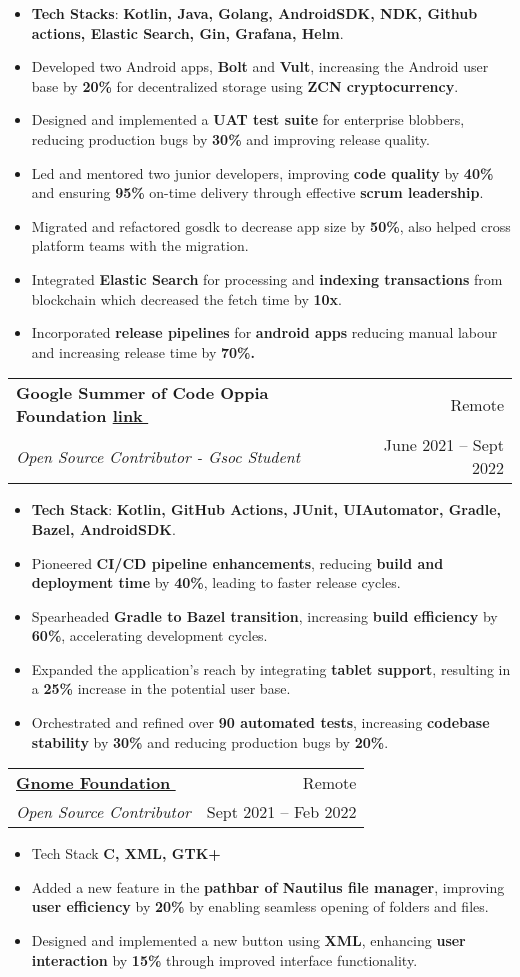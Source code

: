 \documentclass[letterpaper,1pt]{article}
\makeatletter
\let\orighref\href
\renewcommand{\href}[2]{\orighref{#1}{#2\,\faExternalLink}}
\newcommand{\resumeItem}[1]{
  \item\small{
    #1 \vspace{-1.1pt}
  }
}
\newcommand{\resumeSubheading}[4]{
  \vspace{-2.75pt}\item
    \begin{tabular*}{0.97\textwidth}{l@{\extracolsep{\fill}}r}
      \textbf{#1} & #2 \\
      \textit{\small#3} & {\small #4} \\
    \end{tabular*}
}
\newcommand{\resumeItemListStart}{\begin{itemize}}
\newcommand{\resumeItemListEnd}{\end{itemize}\vspace{-7pt}}
\makeatother
\begin{document}
\resumeItemListStart
\resumeItem {\textbf{Tech Stacks}: \textbf{Kotlin, Java, Golang, AndroidSDK, NDK, Github actions, Elastic Search, Gin, Grafana, Helm}.}
\resumeItem {Developed two Android apps, \textbf{Bolt} and \textbf{Vult}, increasing the Android user base by \textbf{20\%} for decentralized storage using \textbf{ZCN cryptocurrency}.}
\resumeItem {Designed and implemented a \textbf{UAT test suite} for enterprise blobbers, reducing production bugs by \textbf{30\%} and improving release quality.}
\resumeItem {Led and mentored two junior developers, improving \textbf{code quality} by \textbf{40\%} and ensuring \textbf{95\%} on-time delivery through effective \textbf{scrum leadership}.}
\resumeItem{Migrated and refactored gosdk to decrease app size by \textbf{50\%}, also helped cross platform teams with the migration.  }
\resumeItem{Integrated \textbf{Elastic Search} for processing and \textbf{indexing transactions} from blockchain which decreased the fetch time by \textbf{10x}.}
\resumeItem{Incorporated \textbf{release pipelines} for \textbf{android apps} reducing manual labour and increasing release time by \textbf{70\%.}}
\resumeItemListEnd

\resumeSubheading
{Google Summer of Code Oppia Foundation \href{https://docs.google.com/document/d/150Yk14Cxmy8OAbSSwgP1aXDBLo1b8HtuIhmrRhzEWU4/edit}{link}}{Remote}
{Open Source Contributor - Gsoc Student}{June 2021 -- Sept 2022}
\resumeItemListStart
\resumeItem {\textbf{Tech Stack}: \textbf{Kotlin, GitHub Actions, JUnit, UIAutomator, Gradle, Bazel, AndroidSDK}.}
\resumeItem {Pioneered \textbf{CI/CD pipeline enhancements}, reducing \textbf{build and deployment time} by \textbf{40\%}, leading to faster release cycles.}
\resumeItem {Spearheaded \textbf{Gradle to Bazel transition}, increasing \textbf{build efficiency} by \textbf{60\%}, accelerating development cycles.}
\resumeItem {Expanded the application’s reach by integrating \textbf{tablet support}, resulting in a \textbf{25\%} increase in the potential user base.}
\resumeItem {Orchestrated and refined over \textbf{90 automated tests}, increasing \textbf{codebase stability} by \textbf{30\%} and reducing production bugs by \textbf{20\%}.}
\resumeItemListEnd

\resumeSubheading
{\href{https://gnome.org}{Gnome Foundation}}{Remote}
{Open Source Contributor}{Sept 2021 -- Feb 2022}
\resumeItemListStart
\resumeItem {Tech Stack \textbf{C, XML, GTK+}}
\resumeItem {Added a new feature in the \textbf{pathbar of Nautilus file manager}, improving \textbf{user efficiency} by \textbf{20\%} by enabling seamless opening of folders and files.}
\resumeItem {Designed and implemented a new button using \textbf{XML}, enhancing \textbf{user interaction} by \textbf{15\%} through improved interface functionality.}
\resumeItemListEnd
\end{document}
